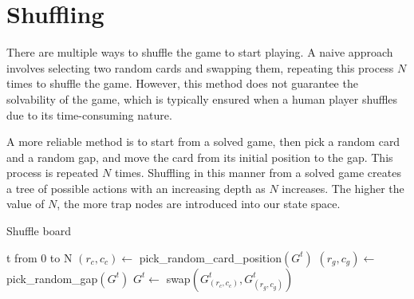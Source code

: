 
\section{Shuffling}
There are multiple ways to shuffle the game to start playing. A naive approach involves selecting two random cards and swapping them, repeating this process $N$ times to shuffle the game. However, this method does not guarantee the solvability of the game, which is typically ensured when a human player shuffles due to its time-consuming nature.

A more reliable method is to start from a solved game, then pick a random card and a random gap, and move the card from its initial position to the gap. This process is repeated $N$ times. Shuffling in this manner from a solved game creates a tree of possible actions with an increasing depth as $N$ increases. The higher the value of $N$, the more trap nodes are introduced into our state space.

\begin{algorithm}[H]
    \caption{Shuffle board}
    \begin{algorithmic}
        \For t from 0 to N
            \State $(r_c, c_c) \gets$ pick\_random\_card\_position$\left(G^t\right)$
            \State $(r_g, c_g) \gets$ pick\_random\_gap$\left(G^t\right)$
            \State $G^t \gets$ swap$\left(G^t_{(r_c,c_c)}, G^t_{(r_g,c_g)}\right)$
        \EndFor
    \end{algorithmic}
\end{algorithm}
